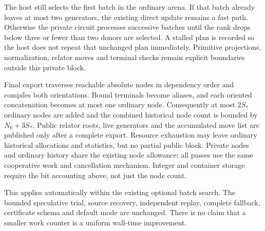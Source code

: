 The host still selects the first batch in the ordinary arena. If that batch
already leaves at most two generators, the existing direct update remains a
fast path. Otherwise the private circuit processes successive batches until
the rank drops below three or fewer than two donors are selected. A stalled
plan is recorded so the host does not repeat that unchanged plan immediately.
Primitive projections, normalization, relator moves and terminal checks remain
explicit boundaries outside this private block.

Final export traverses reachable absolute nodes in dependency order and
compiles both orientations. Bound terminals become aliases, and each oriented
concatenation becomes at most one ordinary node. Consequently at most $2S_*$
ordinary nodes are added and the combined historical node count is bounded by
$N_0+3S_*$. Public relator roots, live generators and the accumulated move list
are published only after a complete export. Resource exhaustion may leave
ordinary historical allocations and statistics, but no partial public block.
Private nodes and ordinary history share the existing node allowance; all
passes use the same cooperative work and cancellation mechanism. Integer and
container storage require the bit accounting above, not just the node count.

This applies automatically within the existing optional batch search. The
bounded speculative trial, source recovery, independent replay, complete
fallback, certificate schema and default mode are unchanged. There is no
claim that a smaller work counter is a uniform wall-time improvement.



